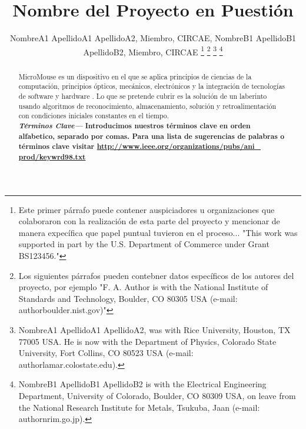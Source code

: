 \documentclass[a4paper]{IEEEtran} %
\providecommand{\keywords}[1]{\textbf{\textit{Términos Clave---}} #1}
\begin{document}

\title{Nombre del Proyecto en Puestión}
\author{NombreA1 ApellidoA1 ApellidoA2, Miembro, CIRCAE, NombreB1 ApellidoB1 ApellidoB2, Miembro, CIRCAE
\thanks{Este primer párrafo puede contener auspiciadores u organizaciones que colaboraron con la realización de esta parte del proyecto y mencionar de manera expecífica que papel puntual tuvieron en el proceso... "This work was supported in part by the U.S. Department of Commerce under Grant BS123456."}
\thanks{Los siguientes párrafos pueden contebner datos específicos de los autores del proyecto, por ejemplo "F. A. Author is with the National Institute of Standards and Technology, Boulder, CO 80305 USA (e-mail: author\@ boulder.nist.gov)"}
\thanks{NombreA1 ApellidoA1 ApellidoA2, was with Rice University, Houston, TX 77005 USA. He is now with the Department of Physics, Colorado State University, Fort Collins, CO 80523 USA (e-mail: author\@ lamar.colostate.edu).}
\thanks{NombreB1 ApellidoB1 ApellidoB2 is with the Electrical Engineering Department, University of Colorado, Boulder, CO 80309 USA, on leave from the National Research Institute for Metals, Tsukuba, Jaan (e-mail: author\@ nrim.go.jp).}}

\maketitle


\begin{abstract}
MicroMouse es un dispositivo en el que se aplica principios de ciencias de la computación, principios ópticos, mecánicos, electrónicos y la integración de tecnologías de software y hardware  . Lo que se pretende cubrir es la solución de un laberinto usando algoritmos de reconocimiento, almacenamiento, solución y retroalimentación con condiciones iniciales constantes en el tiempo.\\

\keywords{\textbf{Introducimos nuestros términos clave en orden alfabetico, separado por comas. Para una lista de sugerencias de palabras o términos clave visitar \underline{http://www.ieee.org/organizations/pubs/ani\_ prod/keywrd98.txt}}}
\end{abstract}

\end{document}
